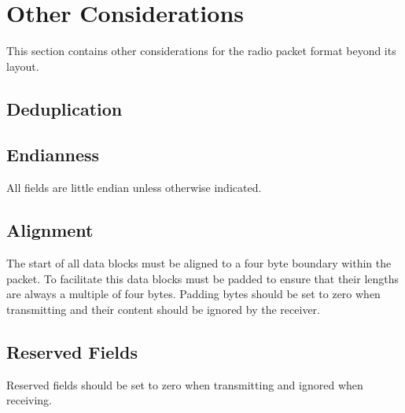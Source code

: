 \section{Other Considerations} \label{sec:other-considerations}

This section contains other considerations for the radio packet format beyond its layout.

\subsection {Deduplication}
\label{subsec:other-considerations_deduplication}

\subsection{Endianness}

All fields are little endian unless otherwise indicated.

\subsection{Alignment}

The start of all data blocks must be aligned to a four byte boundary within the packet. To facilitate this data blocks
must be padded to ensure that their lengths are always a multiple of four bytes. Padding bytes should be set to zero
when transmitting and their content should be ignored by the receiver.

\subsection{Reserved Fields}

Reserved fields should be set to zero when transmitting and ignored when receiving.
